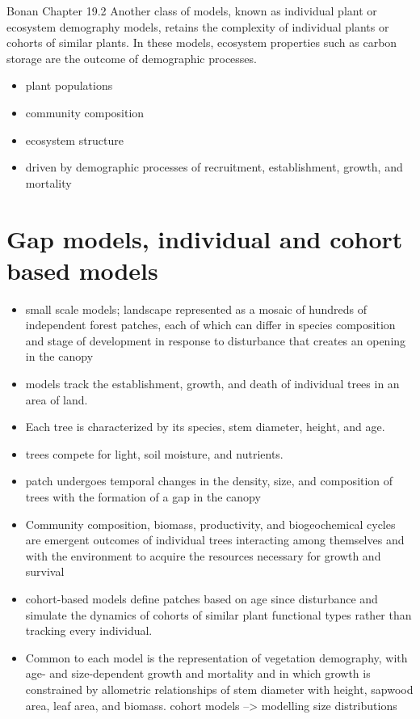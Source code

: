 \documentclass[
  oneside]{book}
\providecommand{\tightlist}{%
  \setlength{\itemsep}{0pt}\setlength{\parskip}{0pt}}
\begin{document}

Bonan Chapter 19.2
Another class of models, known as individual plant or ecosystem demography models, retains the complexity of individual plants or cohorts of similar plants. In these models, ecosystem properties such as carbon storage are the outcome of demographic processes.

\begin{itemize}
\tightlist
\item
  plant populations
\item
  community composition
\item
  ecosystem structure
\item
  driven by demographic processes of recruitment, establishment, growth, and mortality
\end{itemize}

\hypertarget{gap-models-individual-and-cohort-based-models}{%
\section{Gap models, individual and cohort based models}\label{gap-models-individual-and-cohort-based-models}}

\begin{itemize}
\item
  small scale models; landscape represented as a mosaic of hundreds of independent forest patches, each of which can differ in species composition and stage of development in response to disturbance that creates an opening in the canopy
\item
  models track the establishment, growth, and death of individual trees in an area of land.
\item
  Each tree is characterized by its species, stem diameter, height, and age.
\item
  trees compete for light, soil moisture, and nutrients.
\item
  patch undergoes temporal changes in the density, size, and composition of trees with the formation of a gap in the canopy
\item
  Community composition, biomass, productivity, and biogeochemical cycles are emergent outcomes of individual trees interacting among themselves and with the environment to acquire the resources necessary for growth and survival
\item
  cohort-based models define patches based on age since disturbance and simulate the dynamics of cohorts of similar plant functional types rather than tracking every individual.
\item
  Common to each model is the representation of vegetation demography, with age- and size-dependent growth and mortality and in which growth is constrained by allometric relationships of stem diameter with height, sapwood area, leaf area, and biomass. cohort models --\textgreater{} modelling size distributions
\end{itemize}
\end{document}
